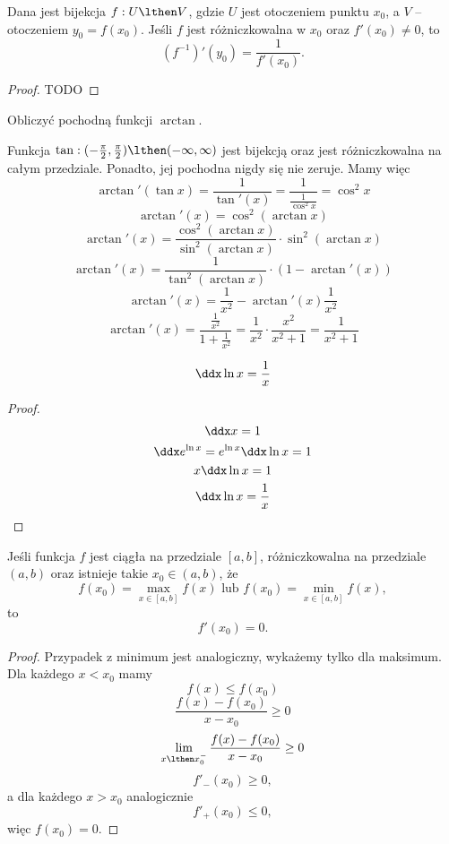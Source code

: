 \begin{theorem}
    Dana jest bijekcja $f: U \lthen V$, gdzie $U$ jest otoczeniem punktu $x_0$, a $V$ -- otoczeniem $y_0 = f(x_0)$. Jeśli $f$ jest różniczkowalna w $x_0$ oraz $f'(x_0) \neq 0$, to
    \[ \left(f^{-1}\right)'(y_0) = \frac{1}{f'(x_0)}. \]
\end{theorem}
\begin{proof}
    TODO
\end{proof}

\begin{example}
    Obliczyć pochodną funkcji $\arctan$.
\end{example}
\begin{solution}
    Funkcja $\tan : (-\frac{\pi}{2}, \frac{\pi}{2}) \lthen (-\infty, \infty)$ jest bijekcją oraz jest różniczkowalna na całym przedziale. Ponadto, jej pochodna nigdy się nie zeruje. Mamy więc
    \[ \arctan'(\tan x) = \frac{1}{\tan'(x)} = \frac{1}{\frac{1}{\cos^2 x}} = \cos^2 x \]
    \[ \arctan'(x) = \cos^2(\arctan x) \]
    \[ \arctan'(x) = \frac{\cos^2(\arctan x)}{\sin^2(\arctan x)} \cdot \sin^2(\arctan x) \]
    \[ \arctan'(x) = \frac{1}{\tan^2(\arctan x)} \cdot (1 - \arctan'(x)) \]
    \[ \arctan'(x) = \frac{1}{x^2} - \arctan'(x)\frac{1}{x^2} \]
    \[ \arctan'(x) = \frac{\frac{1}{x^2}}{1 + \frac{1}{x^2}} = \frac{1}{x^2}\cdot\frac{x^2}{x^2 + 1} = \frac{1}{x^2 + 1} \]
\end{solution}

\begin{theorem}
    \[ \ddx \ln x = \frac{1}{x} \]
\end{theorem}
\begin{proof}
    \begin{gather*}
        \ddx x = 1 \\
        \ddx e^{\ln x} = e^{\ln x} \ddx \ln x = 1 \\
        x \ddx \ln x = 1 \\
        \ddx \ln x = \frac{1}{x}
    \end{gather*}
\end{proof}

\begin{theorem}
    \label{t:zero derivative in extremum}
    Jeśli funkcja $f$ jest ciągła na przedziale $[a, b]$, różniczkowalna na przedziale $(a, b)$ oraz istnieje takie $x_0 \in (a, b)$, że
    \[ f(x_0) = \max_{x \in [a, b]} f(x) \text{ lub } f(x_0) = \min_{x \in [a, b]} f(x), \]
    to
    \[ f'(x_0) = 0. \]
\end{theorem}
\begin{proof}
    Przypadek z minimum jest analogiczny, wykażemy tylko dla maksimum. Dla każdego $x < x_0$ mamy
    \[ f(x) \leq f(x_0) \]
    \[ \frac{f(x) - f(x_0)}{x - x_0} \geq 0 \]
    \[ \lim_{x\lthen x_0^-}\frac{f(x) - f(x_0)}{x - x_0} \geq 0 \]
    \[ f'_-(x_0) \geq 0, \]
    a dla każdego $x > x_0$ analogicznie
    \[ f'_+(x_0) \leq 0, \]
    więc $f(x_0) = 0$.
\end{proof}

